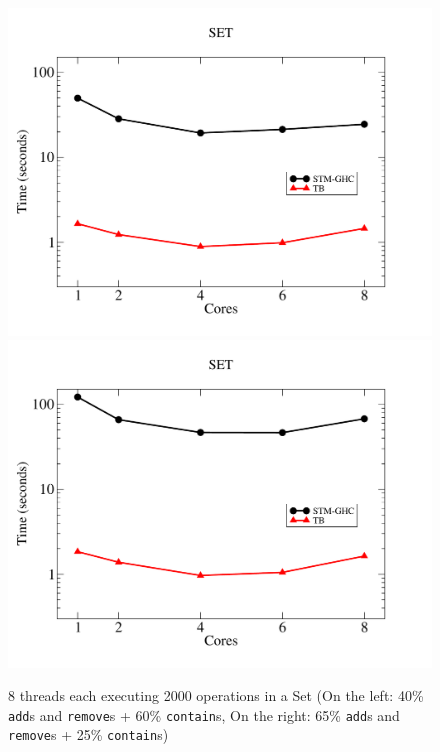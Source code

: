\documentclass{llncs}
\begin{document}
\begin{figure}[htbp]
\vspace{-5mm}
        \centering
                \includegraphics[scale=0.2]{leituras.pdf}\includegraphics[scale=0.2]{escritas.pdf}
        \caption{8 threads each executing 2000 operations in a Set (On the left: 40\% {\tt add}s and {\tt remove}s + 60\% {\tt contain}s,
On the right: 65\% {\tt add}s and {\tt remove}s + 25\% {\tt contain}s)}
        \label{fig:set1}
\end{figure}


\end{document}
